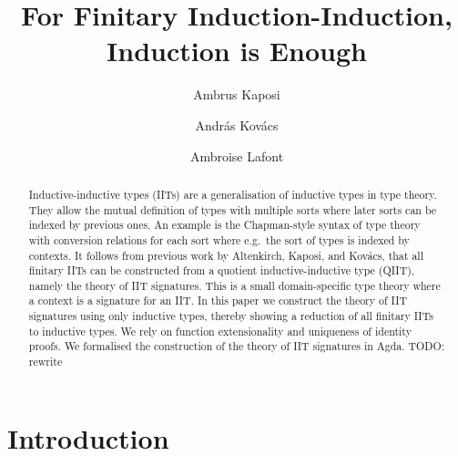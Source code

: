\documentclass[a4paper,UKenglish,cleveref, autoref]{lipics-v2019}
\title{For Finitary Induction-Induction, \\ Induction is Enough} %
\author{Ambrus Kaposi}{E{\"o}tv{\"o}s Lor{\'a}nd University, Budapest, Hungary}{akaposi@inf.elte.hu}{https://orcid.org/0000-0001-9897-8936}{this author was supported by the National Research,
Development and Innovation Fund of Hungary, financed under the
Thematic Excellence Programme funding scheme, Project
no. ED18-1-2019-0030 (Application-specific highly reliable IT
solutions), by the New National Excellence Program of the Ministry
for Innovation and Technology, Project no. ÚNKP-19-4-ELTE-874, and
by the Bolyai Fellowship of the Hungarian Academy of Sciences,
Project no. BO/00659/19/3.}%
\author{Andr{\'a}s Kov{\'a}cs}{E{\"o}tv{\"o}s Lor{\'a}nd University, Budapest, Hungary}{kovacsandras@inf.elte.hu}{https://orcid.org/0000-0002-6375-9781}{this author was supported by the European Union, co-financed by the European Social Fund (EFOP-3.6.3-VEKOP-16-2017-00002).}
\author{Ambroise Lafont}{IMT Atlantique, Inria, LS2N CNRS, Nantes, France}{ambroise.lafont@inria.fr}{https://orcid.org/0000-0002-9299-641X}{}
\begin{document}
\maketitle

\begin{abstract}
  Inductive-inductive types (IITs) are a generalisation of inductive types in
  type theory. They allow the mutual definition of types with multiple sorts
  where later sorts can be indexed by previous ones. An example is the
  Chapman-style syntax of type theory with conversion relations for each sort
  where e.g.\ the sort of types is indexed by contexts. It follows from previous
  work by Altenkirch, Kaposi, and Kov{\'a}cs, that all finitary IITs can be constructed from a quotient
  inductive-inductive type (QIIT), namely the theory of IIT signatures. This is
  a small domain-specific type theory where a context is a signature for an
  IIT. In this paper we construct the theory of IIT signatures using only inductive types,
  thereby showing a reduction of all finitary IITs to inductive types.  We rely
  on function extensionality and uniqueness of identity proofs. We formalised
  the construction of the theory of IIT signatures in Agda. TODO: rewrite
\end{abstract}


\section{Introduction}
\label{sec:intro}
\end{document}
